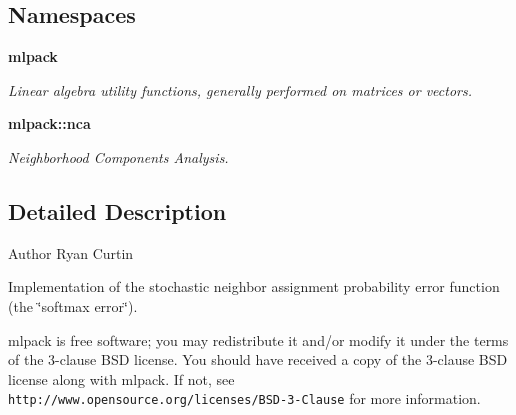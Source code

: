 \subsection*{Namespaces}
\begin{DoxyCompactItemize}
\item 
 {\bf mlpack}
\begin{DoxyCompactList}\small\item\em Linear algebra utility functions, generally performed on matrices or vectors. \end{DoxyCompactList}\item 
 {\bf mlpack\+::nca}
\begin{DoxyCompactList}\small\item\em Neighborhood Components Analysis. \end{DoxyCompactList}\end{DoxyCompactItemize}


\subsection{Detailed Description}
\begin{DoxyAuthor}{Author}
Ryan Curtin
\end{DoxyAuthor}
Implementation of the stochastic neighbor assignment probability error function (the \char`\"{}softmax error\char`\"{}).

mlpack is free software; you may redistribute it and/or modify it under the terms of the 3-\/clause B\+SD license. You should have received a copy of the 3-\/clause B\+SD license along with mlpack. If not, see {\tt http\+://www.\+opensource.\+org/licenses/\+B\+S\+D-\/3-\/\+Clause} for more information. 